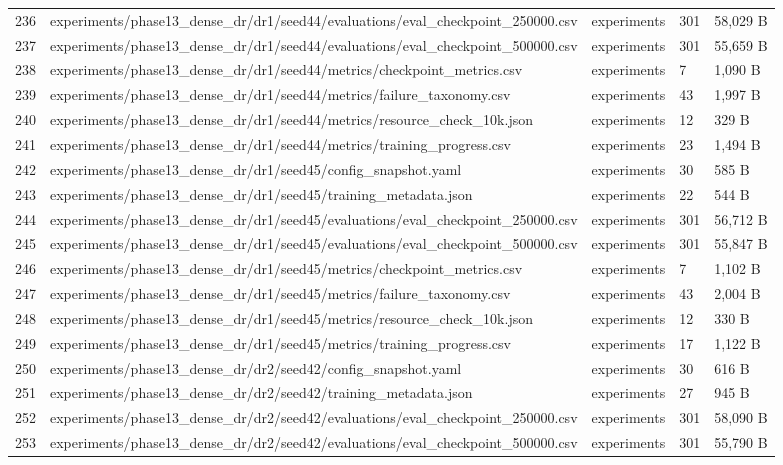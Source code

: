 \documentclass[11pt,a4paper,oneside]{book}
\begin{document}
\begin{longtable}{l l l l l}
236 & experiments/phase13\_dense\_dr/dr1/seed44/evaluations/eval\_checkpoint\_250000.csv & experiments & 301 & 58,029 B \\
237 & experiments/phase13\_dense\_dr/dr1/seed44/evaluations/eval\_checkpoint\_500000.csv & experiments & 301 & 55,659 B \\
238 & experiments/phase13\_dense\_dr/dr1/seed44/metrics/checkpoint\_metrics.csv & experiments & 7 & 1,090 B \\
239 & experiments/phase13\_dense\_dr/dr1/seed44/metrics/failure\_taxonomy.csv & experiments & 43 & 1,997 B \\
240 & experiments/phase13\_dense\_dr/dr1/seed44/metrics/resource\_check\_10k.json & experiments & 12 & 329 B \\
241 & experiments/phase13\_dense\_dr/dr1/seed44/metrics/training\_progress.csv & experiments & 23 & 1,494 B \\
242 & experiments/phase13\_dense\_dr/dr1/seed45/config\_snapshot.yaml & experiments & 30 & 585 B \\
243 & experiments/phase13\_dense\_dr/dr1/seed45/training\_metadata.json & experiments & 22 & 544 B \\
244 & experiments/phase13\_dense\_dr/dr1/seed45/evaluations/eval\_checkpoint\_250000.csv & experiments & 301 & 56,712 B \\
245 & experiments/phase13\_dense\_dr/dr1/seed45/evaluations/eval\_checkpoint\_500000.csv & experiments & 301 & 55,847 B \\
246 & experiments/phase13\_dense\_dr/dr1/seed45/metrics/checkpoint\_metrics.csv & experiments & 7 & 1,102 B \\
247 & experiments/phase13\_dense\_dr/dr1/seed45/metrics/failure\_taxonomy.csv & experiments & 43 & 2,004 B \\
248 & experiments/phase13\_dense\_dr/dr1/seed45/metrics/resource\_check\_10k.json & experiments & 12 & 330 B \\
249 & experiments/phase13\_dense\_dr/dr1/seed45/metrics/training\_progress.csv & experiments & 17 & 1,122 B \\
250 & experiments/phase13\_dense\_dr/dr2/seed42/config\_snapshot.yaml & experiments & 30 & 616 B \\
251 & experiments/phase13\_dense\_dr/dr2/seed42/training\_metadata.json & experiments & 27 & 945 B \\
252 & experiments/phase13\_dense\_dr/dr2/seed42/evaluations/eval\_checkpoint\_250000.csv & experiments & 301 & 58,090 B \\
253 & experiments/phase13\_dense\_dr/dr2/seed42/evaluations/eval\_checkpoint\_500000.csv & experiments & 301 & 55,790 B \\

\end{longtable}
\end{document}
